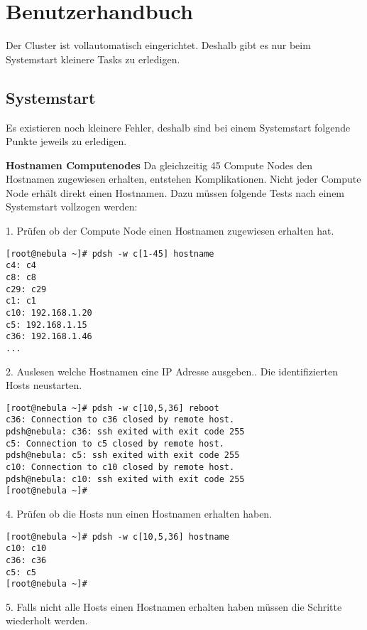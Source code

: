 \section{Benutzerhandbuch}
Der Cluster ist vollautomatisch eingerichtet. Deshalb gibt es nur beim Systemstart kleinere Tasks zu erledigen.

\subsection{Systemstart}
Es existieren noch kleinere Fehler, deshalb sind bei einem Systemstart folgende Punkte jeweils zu erledigen.

\textbf{Hostnamen Computenodes}\newline
Da gleichzeitig 45 Compute Nodes den Hostnamen zugewiesen erhalten, entstehen Komplikationen. Nicht jeder Compute Node erhält direkt einen Hostnamen. Dazu müssen folgende Tests nach einem Systemstart vollzogen werden:

1. Prüfen ob der Compute Node einen Hostnamen zugewiesen erhalten hat.
\begin{lstlisting}
[root@nebula ~]# pdsh -w c[1-45] hostname
c4: c4
c8: c8
c29: c29
c1: c1
c10: 192.168.1.20
c5: 192.168.1.15
c36: 192.168.1.46
...
\end{lstlisting}
2. Auslesen welche Hostnamen eine IP Adresse ausgeben.. Die identifizierten Hosts neustarten.
\begin{lstlisting}
[root@nebula ~]# pdsh -w c[10,5,36] reboot
c36: Connection to c36 closed by remote host.
pdsh@nebula: c36: ssh exited with exit code 255
c5: Connection to c5 closed by remote host.
pdsh@nebula: c5: ssh exited with exit code 255
c10: Connection to c10 closed by remote host.
pdsh@nebula: c10: ssh exited with exit code 255
[root@nebula ~]#
\end{lstlisting}
4. Prüfen ob die Hosts nun einen Hostnamen erhalten haben.
\begin{lstlisting}
[root@nebula ~]# pdsh -w c[10,5,36] hostname
c10: c10
c36: c36
c5: c5
[root@nebula ~]#
\end{lstlisting}
5. Falls nicht alle Hosts einen Hostnamen erhalten haben müssen die Schritte wiederholt werden.

